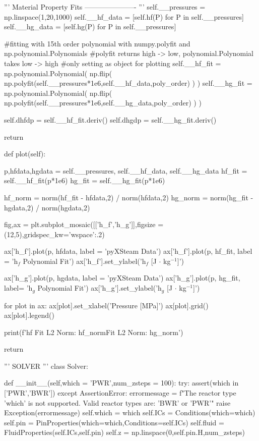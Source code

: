 \documentclass{article}
\begin{document}
\begin{python}
        '''
        Material Property Fits
        ----------------------
        '''
        self.__pressures = np.linspace(1,20,1000)
        self.__hf_data = [self.hf(P) for P in self.__pressures] 
        self.__hg_data = [self.hg(P) for P in self.__pressures]

        #fitting with 15th order polynomial with numpy.polyfit and np.polynomial.Polynomials
        #polyfit returns high -> low, polynomial.Polynomial takes low -> high 
        #only setting as object for plotting
        self.__hf_fit = np.polynomial.Polynomial( np.flip( np.polyfit(self.__pressures*1e6,self.__hf_data,poly_order) ) ) 
        self.__hg_fit = np.polynomial.Polynomial( np.flip( np.polyfit(self.__pressures*1e6,self.__hg_data,poly_order) ) ) 

        self.dhfdp = self.__hf_fit.deriv()
        self.dhgdp = self.__hg_fit.deriv()
        
        return

    def plot(self):
        
        p,hfdata,hgdata = self.__pressures, self.__hf_data, self.__hg_data
        hf_fit = self.__hf_fit(p*1e6)
        hg_fit = self.__hg_fit(p*1e6)

        hf_norm = norm(hf_fit - hfdata,2) / norm(hfdata,2)
        hg_norm = norm(hg_fit - hgdata,2) / norm(hgdata,2)
        
        fig,ax = plt.subplot_mosaic([['h_f','h_g']],figsize = (12,5),gridspec_kw={'wspace':.2})
        
        ax['h_f'].plot(p, hfdata, label = 'pyXSteam Data')
        ax['h_f'].plot(p, hf_fit, label = 'h$_f$ Polynomial Fit')
        ax['h_f'].set_ylabel('h$_f$  [J $\cdot$ kg$^{-1}$]')

        ax['h_g'].plot(p, hgdata, label = 'pyXSteam Data')
        ax['h_g'].plot(p, hg_fit, label= 'h$_{g}$ Polynomial Fit')
        ax['h_g'].set_ylabel('h$_{g}$  [J $\cdot$ kg$^{-1}$]')

        for plot in ax:
            ax[plot].set_xlabel('Pressure  [MPa]')
            ax[plot].grid()
            ax[plot].legend()

        print(f'hf Fit L2 Norm: {hf_norm}\nhg Fit L2 Norm: {hg_norm}')
        
        
        return 
        
'''
SOLVER
'''
class Solver:
    
    def __init__(self,which = 'PWR',num_zsteps = 100):
        try:
            assert(which in ['PWR','BWR'])
        except AssertionError:
            errormessage = f"The reactor type '{which}' is not supported. Valid reactor types are: 'BWR' or 'PWR'"
            raise Exception(errormessage)
        self.which = which
        self.ICs = Conditions(which=which)
        self.pin = PinProperties(which=which,Conditions=self.ICs)
        self.fluid = FluidProperties(self.ICs,self.pin)
        self.z = np.linspace(0,self.pin.H,num_zsteps)
        

\end{python}
\end{document}
